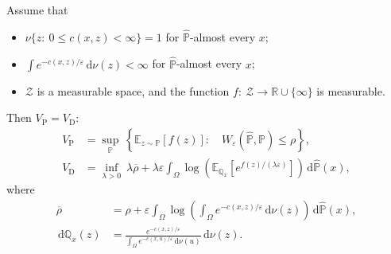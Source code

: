 \documentclass[landscape,a0b,final,a4resizeable]{include/a0poster}
\newcommand{\bQ}{\mathbb{Q}}
\newcommand{\Reg}{\varepsilon}
\newcommand{\diff}{\,\mathrm{d}}
\begin{document}
\begin{poster}
\begin{multicols}{4}
\newpage 
\begin{tcolorbox}[title=Theorem: Strong Dual Reformulation,
fonttitle=\LARGE\bfseries,
colback=red!5,colframe=red!65!black,
boxsep = 1mm, arc = 15pt, boxrule = 0.5pt,
boxrule=1pt,
toptitle=4mm,
  bottomtitle=4mm,
]
{
\LARGE
Assume that 
\begin{itemize}
    \item$\nu\{z:~0\le c(x,z)<\infty\}=1$ for $\widehat{\mathbb{P}}$-almost every $x$; 
    \item$\int e^{-c(x,z)/\Reg}\diff\nu(z) <\infty$ for $\widehat{\mathbb{P}}$-almost every $x$;
    \item$\mathcal{Z}$ is a measurable space, and the function $f:~\mathcal{Z}\to\mathbb{R}\cup\{\infty\}$ is measurable.
\end{itemize}
Then $V_{\text{P}} = V_{\text{D}}$:
\begin{equation*}
\begin{aligned}
V_{\text{P}}
&=\sup_{\mathbb{P}}~
\left\{\mathbb{E}_{z\sim \mathbb{P}}[f(z)]:\quad
W_{{\Reg}}(\widehat{\mathbb{P}}, \mathbb{P})\le \rho
\right\},\\
V_{\text{D}}
&=
\inf_{\lambda>0}~\lambda\overline{\rho}+\lambda{\Reg}\int_{\Omega}\log\left(
\mathbb{E}_{\bQ_x}\left[ 
e^{f(z)/(\lambda{\Reg})}
\right]\right)\diff\widehat{\mathbb{P}}(x),
\end{aligned}
\end{equation*}
where
\[
\begin{aligned}
 \overline{\rho} &= \rho+{\Reg}\int_{\Omega}\log\left(\int_{\Omega}e^{-c(x,z)/{\Reg}}\diff\nu(z)\right)\diff\widehat{\mathbb{P}}(x),
 \\
\diff\bQ_{x}(z) &= \frac{e^{-c(x,z)/{\Reg}}}{\int_{\Omega}e^{-c(x,u)/{\Reg}}\diff\nu(u)}\diff\nu(z).
\end{aligned}
\]
}
\end{tcolorbox}





















\end{multicols}
\end{poster}
\end{document}
